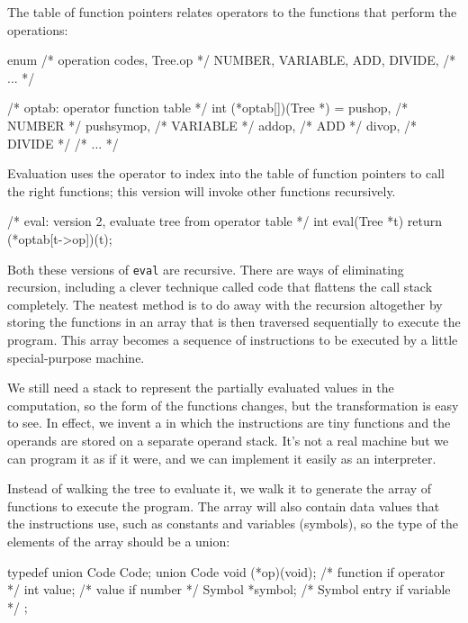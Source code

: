 The table of function pointers relates operators to the functions that
perform the operations:
\begin{wellcode}
    enum {  /* operation codes, Tree.op */
        NUMBER,
        VARIABLE,
        ADD,
        DIVIDE,
        /* ... */
    }

    /* optab: operator function table */
    int (*optab[])(Tree *) = {
        pushop,     /* NUMBER */
        pushsymop,  /* VARIABLE */
        addop,      /* ADD */
        divop,      /* DIVIDE */
        /* ... */
    }
\end{wellcode}
Evaluation uses the operator to index into the table of function pointers
to call the right functions; this version will invoke other functions
recursively.
\begin{wellcode}
    /* eval: version 2, evaluate tree from operator table */
    int eval(Tree *t)
    {
        return (*optab[t->op])(t);
    }
\end{wellcode}

Both these versions of \verb'eval' are recursive. There are ways of
eliminating recursion, including a clever technique called
 code that flattens the call stack completely.
The neatest method is to do away with the recursion altogether by storing
the functions in an array that is then traversed sequentially to execute
the program.  This array becomes a sequence of instructions to be executed
by a little special-purpose machine.

We still need a stack to represent the partially evaluated values in the
computation, so the form of the functions changes, but the transformation
is easy to see. In effect, we invent a  in
which the instructions are tiny functions and the operands are stored on a
separate operand stack. It's not a real machine but we can program it as if
it were, and we can implement it easily as an interpreter.

Instead of walking the tree to evaluate it, we walk it to generate the
array of functions to execute the program. The array will also contain data
values that the instructions use, such as constants and variables
(symbols), so the type of the elements of the array should be a union:
\begin{wellcode}
    typedef union Code Code;
    union Code {
        void    (*op)(void);    /* function if operator */
        int     value;          /* value if number */
        Symbol  *symbol;        /* Symbol entry if variable */
    };
\end{wellcode}

